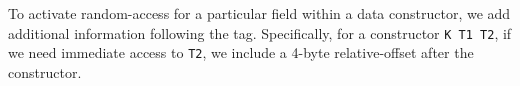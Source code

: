 \documentclass[showabstract,showacknowledgments,showpreface,showdedication]{iuphd}
\theoremstyle{nonumberplain}
\newcommand{\il}[1]{\lstinline[style=inline,mathescape=true];#1;}
\begin{document}
To activate random-access for a particular field within a data constructor, we
add additional information following the tag.  Specifically, for a constructor
\il{K T1 T2}, if we need immediate access to \il{T2}, we include a 4-byte
relative-offset after the constructor.
%


%
\end{document}
